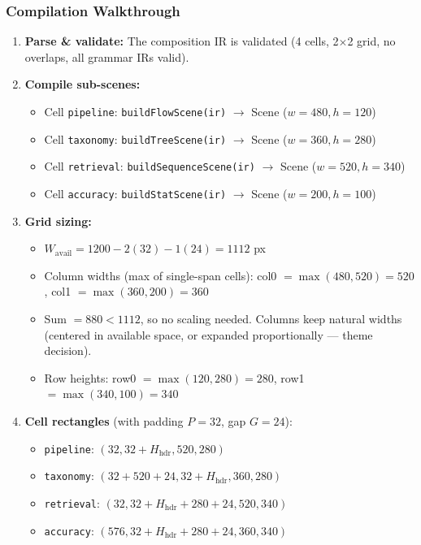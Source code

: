 \subsubsection{Compilation Walkthrough}

\begin{enumerate}
  \item \textbf{Parse \& validate:} The composition IR is validated (4 cells, 2$\times$2 grid, no overlaps, all grammar IRs valid).

  \item \textbf{Compile sub-scenes:}
  \begin{itemize}
    \item Cell \texttt{pipeline}: \texttt{buildFlowScene(ir)} $\to$ Scene ($w{=}480, h{=}120$)
    \item Cell \texttt{taxonomy}: \texttt{buildTreeScene(ir)} $\to$ Scene ($w{=}360, h{=}280$)
    \item Cell \texttt{retrieval}: \texttt{buildSequenceScene(ir)} $\to$ Scene ($w{=}520, h{=}340$)
    \item Cell \texttt{accuracy}: \texttt{buildStatScene(ir)} $\to$ Scene ($w{=}200, h{=}100$)
  \end{itemize}

  \item \textbf{Grid sizing:}
  \begin{itemize}
    \item $W_{\text{avail}} = 1200 - 2(32) - 1(24) = 1112$ px
    \item Column widths (max of single-span cells): col0 $= \max(480, 520) = 520$, col1 $= \max(360, 200) = 360$
    \item Sum $= 880 < 1112$, so no scaling needed.  Columns keep natural widths (centered in available space, or expanded proportionally --- theme decision).
    \item Row heights: row0 $= \max(120, 280) = 280$, row1 $= \max(340, 100) = 340$
  \end{itemize}

  \item \textbf{Cell rectangles} (with padding $P{=}32$, gap $G{=}24$):
  \begin{itemize}
    \item \texttt{pipeline}: $(32, 32{+}H_{\text{hdr}}, 520, 280)$
    \item \texttt{taxonomy}: $(32{+}520{+}24, 32{+}H_{\text{hdr}}, 360, 280)$
    \item \texttt{retrieval}: $(32, 32{+}H_{\text{hdr}}{+}280{+}24, 520, 340)$
    \item \texttt{accuracy}: $(576, 32{+}H_{\text{hdr}}{+}280{+}24, 360, 340)$
  \end{itemize}


\end{enumerate}
